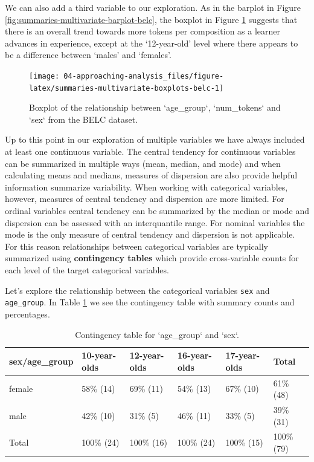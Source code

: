 \documentclass[
]{article}
\begin{document}
We can also add a third variable to our exploration. As in the barplot in Figure \ref{fig:summaries-multivariate-barplot-belc}, the boxplot in Figure \ref{fig:summaries-multivariate-boxplots-belc} suggests that there is an overall trend towards more tokens per composition as a learner advances in experience, except at the `12-year-old' level where there appears to be a difference between `males' and `females'.

\begin{figure}

{\centering \texttt{[image: 04-approaching-analysis\_files/figure-latex/summaries-multivariate-boxplots-belc-1]} 

}

\caption{Boxplot of the relationship between `age_group`, `num_tokens` and `sex` from the BELC dataset.}\label{fig:summaries-multivariate-boxplots-belc}
\end{figure}

Up to this point in our exploration of multiple variables we have always included at least one continuous variable. The central tendency for continuous variables can be summarized in multiple ways (mean, median, and mode) and when calculating means and medians, measures of dispersion are also provide helpful information summarize variability. When working with categorical variables, however, measures of central tendency and dispersion are more limited. For ordinal variables central tendency can be summarized by the median or mode and dispersion can be assessed with an interquantile range. For nominal variables the mode is the only measure of central tendency and dispersion is not applicable. For this reason relationships between categorical variables are typically summarized using \textbf{contingency tables} which provide cross-variable counts for each level of the target categorical variables.

Let's explore the relationship between the categorical variables \texttt{sex} and \texttt{age\_group}. In Table \ref{tab:summaries-bivariate-categorical-table-belc} we see the contingency table with summary counts and percentages.

\begin{table}

\caption{\label{tab:summaries-bivariate-categorical-table-belc}Contingency table for `age_group` and `sex`.}
\centering
\begin{tabular}[t]{llllll}
\toprule
sex/age\_group & 10-year-olds & 12-year-olds & 16-year-olds & 17-year-olds & Total\\
\midrule
female & 58\% (14) & 69\% (11) & 54\% (13) & 67\% (10) & 61\% (48)\\
male & 42\% (10) & 31\%  (5) & 46\% (11) & 33\%  (5) & 39\% (31)\\
Total & 100\% (24) & 100\% (16) & 100\% (24) & 100\% (15) & 100\% (79)\\
\bottomrule
\end{tabular}
\end{table}
\end{document}
